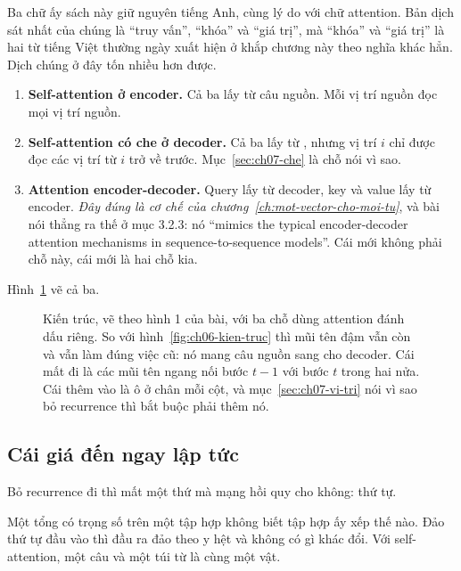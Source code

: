 Ba chữ ấy sách này giữ nguyên tiếng Anh, cùng lý do với chữ attention. Bản dịch
sát nhất của chúng là \enquote{truy vấn}, \enquote{khóa} và \enquote{giá trị},
mà \enquote{khóa} và \enquote{giá trị} là hai từ tiếng Việt thường ngày xuất
hiện ở khắp chương này theo nghĩa khác hẳn. Dịch chúng ở đây tốn nhiều hơn được.

\begin{enumerate}
  \item \textbf{Self-attention ở encoder.} Cả ba lấy từ câu nguồn. Mỗi vị trí
    nguồn đọc mọi vị trí nguồn.
  \item \textbf{Self-attention có che ở decoder.} Cả ba lấy từ
    , nhưng
    vị trí \(i\) chỉ được đọc các vị trí từ \(i\) trở về trước.
    Mục~\ref{sec:ch07-che} là chỗ nói vì sao.
  \item \textbf{Attention encoder-decoder.} Query lấy từ decoder, key và value
    lấy từ encoder. \emph{Đây đúng là cơ chế của
    chương~\ref{ch:mot-vector-cho-moi-tu}}, và bài nói thẳng ra thế ở mục 3.2.3:
    nó \enquote{mimics the typical encoder-decoder attention mechanisms in
    sequence-to-sequence models}. Cái mới không phải chỗ này, cái mới là hai
    chỗ kia.
\end{enumerate}

Hình~\ref{fig:ch07-kien-truc} vẽ cả ba.

\begin{figure}[htbp]
  \centering
  
  \caption{Kiến trúc, vẽ theo hình 1 của bài, với ba chỗ dùng attention đánh
    dấu riêng. So với hình~\ref{fig:ch06-kien-truc} thì mũi tên đậm vẫn còn và
    vẫn làm đúng việc cũ: nó mang câu nguồn sang cho decoder. Cái mất đi là các
    mũi tên ngang nối bước \(t-1\) với bước \(t\) trong hai nửa. Cái thêm vào là
    ô  ở chân mỗi cột, và
    mục~\ref{sec:ch07-vi-tri} nói vì sao bỏ
    recurrence thì bắt buộc phải thêm nó.}
  \label{fig:ch07-kien-truc}
\end{figure}

\subsection*{Cái giá đến ngay lập tức}

%
Bỏ recurrence đi thì mất một thứ mà mạng hồi quy cho không: thứ tự.

Một tổng có trọng số trên một tập hợp không biết tập hợp ấy xếp thế nào. Đảo
thứ tự đầu vào thì đầu ra đảo theo y hệt và không có gì khác đổi. Với
self-attention, một câu và một túi từ là cùng một vật.

